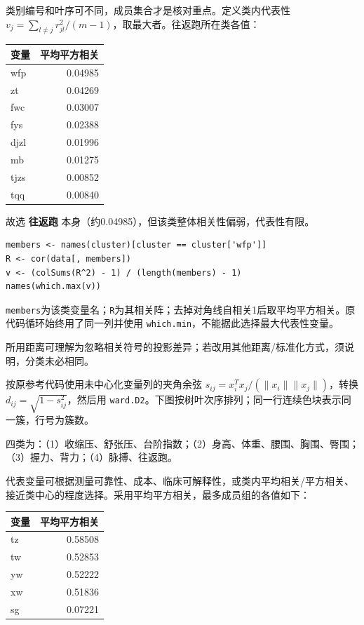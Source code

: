 类别编号和叶序可不同，成员集合才是核对重点。定义类内代表性 \(v_j=\sum_{l\ne j}r_{jl}^2/(m-1)\)，取最大者。往返跑所在类各值：

\begin{center}\small\setlength{\tabcolsep}{4pt}\renewcommand{\arraystretch}{1.18}\begin{tabular}{@{}lr@{}}
\toprule
变量 & 平均平方相关 \\
\midrule

wfp & 0.04985 \\
zt & 0.04269 \\
fwc & 0.03007 \\
fys & 0.02388 \\
djzl & 0.01996 \\
mb & 0.01275 \\
tjzs & 0.00852 \\
tqq & 0.00840 \\
\bottomrule\end{tabular}\end{center}

故选 \textbf{往返跑} 本身（约0.04985），但该类整体相关性偏弱，代表性有限。

\begin{verbatim}
members <- names(cluster)[cluster == cluster['wfp']]
R <- cor(data[, members])
v <- (colSums(R^2) - 1) / (length(members) - 1)
names(which.max(v))
\end{verbatim}

\texttt{members}为该类变量名；\texttt{R}为其相关阵；去掉对角线自相关1后取平均平方相关。原代码循环始终用了同一列并使用 \texttt{which.min}，不能据此选择最大代表性变量。

所用距离可理解为忽略相关符号的投影差异；若改用其他距离/标准化方式，须说明，分类未必相同。



按原参考代码使用未中心化变量列的夹角余弦 \(s_{ij}=x_i^Tx_j/(\|x_i\|\|x_j\|)\)，转换 \(d_{ij}=\sqrt{1-s_{ij}^2}\)，然后用 \texttt{ward.D2}。下图按树叶次序排列；同一行连续色块表示同一簇，行号为簇数。



四类为：（1）收缩压、舒张压、台阶指数；（2）身高、体重、腰围、胸围、臀围；（3）握力、背力；（4）脉搏、往返跑。

代表变量可根据测量可靠性、成本、临床可解释性，或类内平均相关/平方相关、接近类中心的程度选择。采用平均平方相关，最多成员组的各值如下：

\begin{center}\small\setlength{\tabcolsep}{4pt}\renewcommand{\arraystretch}{1.18}\begin{tabular}{@{}lr@{}}
\toprule
变量 & 平均平方相关 \\
\midrule

tz & 0.58508 \\
tw & 0.52853 \\
yw & 0.52222 \\
xw & 0.51836 \\
sg & 0.07221 \\
\bottomrule\end{tabular}\end{center}


